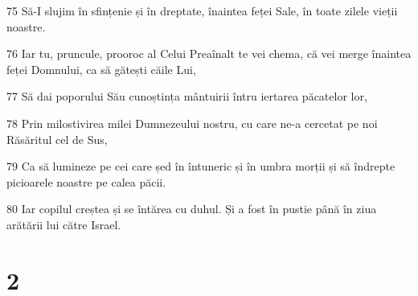 \par 75 Să-I slujim în sfințenie și în dreptate, înaintea feței Sale, în toate zilele vieții noastre.
\par 76 Iar tu, pruncule, prooroc al Celui Preaînalt te vei chema, că vei merge înaintea feței Domnului, ca să gătești căile Lui,
\par 77 Să dai poporului Său cunoștința mântuirii întru iertarea păcatelor lor,
\par 78 Prin milostivirea milei Dumnezeului nostru, cu care ne-a cercetat pe noi  Răsăritul cel de Sus,
\par 79 Ca să lumineze pe cei care șed în întuneric și în umbra morții și să îndrepte picioarele noastre pe calea păcii.
\par 80 Iar copilul creștea și se întărea cu duhul. Și a fost în pustie până în ziua arătării lui către Israel.

\chapter{2}

